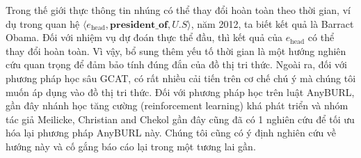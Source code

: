 Trong thế giới thực thông tin nhúng có thể thay đổi hoàn toàn theo thời gian, ví dụ trong quan hệ $\langle e_{\text{head}}, \textbf{president_of}, U.S\rangle$, năm 2012, ta biết kết quả là Barract Obama. Đối với nhiệm vụ dự đoán thực thể đầu, thì kết quả của $e_{\text{head}}$ có thể thay đổi hoàn toàn. Vì vậy, bổ sung thêm yếu tố thời gian là một hướng nghiên cứu quan trọng để đảm bảo tính đúng đắn của đồ thị tri thức. Ngoài ra, đối với phương pháp học sâu GCAT, có rất nhiều cải tiến trên cơ chế chú ý mà chúng tôi muốn áp dụng vào đồ thị tri thức. Đối với phương pháp học trên luật AnyBURL, gần đây nhánh học tăng cường (reinforcement learning) khá phát triển và nhóm tác giả Meilicke, Christian and Chekol \cite{meilicke2020reinforced} gần đây cũng đã có 1 nghiên cứu để tối ưu hóa lại phương pháp AnyBURL này.
Chúng tôi cũng có ý định nghiên cứu về hướng này và cố gắng báo cáo lại trong một tương lai gần.